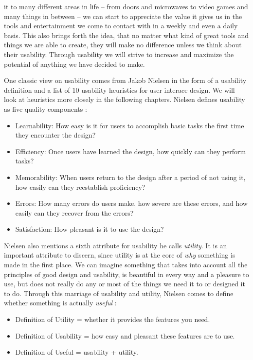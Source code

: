 it to many different areas in life -- from doors and microwaves to video games and many things in between -- we can start to appreciate the value it gives us in the tools and entertainment we come to contact with in a weekly and even a daily basis. This also brings forth the idea, that no matter what kind of great tools and things we are able to create, they will make no difference unless we think about their usability. Through usability we will strive to increase and maximize the potential of anything we have decided to make.

One classic view on usability comes from Jakob Nielsen in the form of a usability definition and a list of 10 usability heuristics for user interace design. We will look at heuristics more closely in the following chapters. Nielsen defines usability as five quality components \cite{Nielsen2012}:

\begin{itemize}
	\item Learnability: How easy is it for users to accomplish basic tasks the first time they encounter the design?
	\item Efficiency: Once users have learned the design, how quickly can they perform tasks?
	\item Memorability: When users return to the design after a period of not using it, how easily can they reestablish proficiency?
	\item Errors: How many errors do users make, how severe are these errors, and how easily can they recover from the errors?
	\item Satisfaction: How pleasant is it to use the design?
\end{itemize}

Nielsen also mentions a sixth attribute for usability he calls \textit{utility}. It is an important attribute to discern, since utility is at the core of \textit{why} something is made in the first place. We can imagine something that takes into account all the principles of good design and usability, is beautiful in every way and a pleasure to use, but does not really do any or most of the things we need it to or designed it to do. Through this marriage of usability and utility, Nielsen comes to define whether something is actually \textit{useful} \cite{Nielsen2012}: 

\begin{itemize}

	\item Definition of Utility = whether it provides the features you need.
	\item Definition of Usability = how easy and pleasant these features are to use.
	\item Definition of Useful = usability + utility.

\end{itemize}

